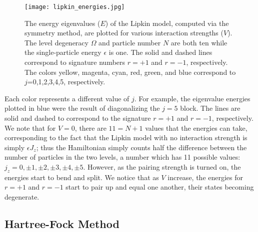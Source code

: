\documentclass[10pt]{article}
\begin{document}
\begin{figure}
    \centering
    \texttt{[image: lipkin\_energies.jpg]}
    \caption{The energy eigenvalues ($E$) of the Lipkin model, computed via the symmetry method, are plotted for various interaction strengths ($V$). The level degeneracy $\Omega$ and particle number $N$ are both ten while the single-particle energy $\epsilon$ is one. The solid and dashed lines correspond to signature numbers $r=+1$ and $r=-1$, respectively. The colors yellow, magenta, cyan, red, green, and blue correspond to $j$=0,1,2,3,4,5, respectively.}
    \label{fig:lipkin_energies}
\end{figure}
Each color represents a different value of $j$. For example, the eigenvalue energies plotted in blue were the result of diagonalizing the $j=5$ block. The lines are solid and dashed to correspond to the signature $r=+1$ and $r=-1$, respectively. We note that for $V=0$, there are $11=N+1$ values that the energies can take, corresponding to the fact that the Lipkin model with no interaction strength is simply $\epsilon J_z$; thus the Hamiltonian simply counts half the difference between the number of particles in the two levels, a number which has 11 possible values: $j_z=0,\pm1,\pm2,\pm3,\pm4,\pm5$. However, as the pairing strength is turned on, the energies start to bend and split. We notice that as $V$ increase, the energies for $r=+1$ and $r=-1$ start to pair up and equal one another, their states becoming degenerate. 

\subsection{Hartree-Fock Method}
\end{document}
